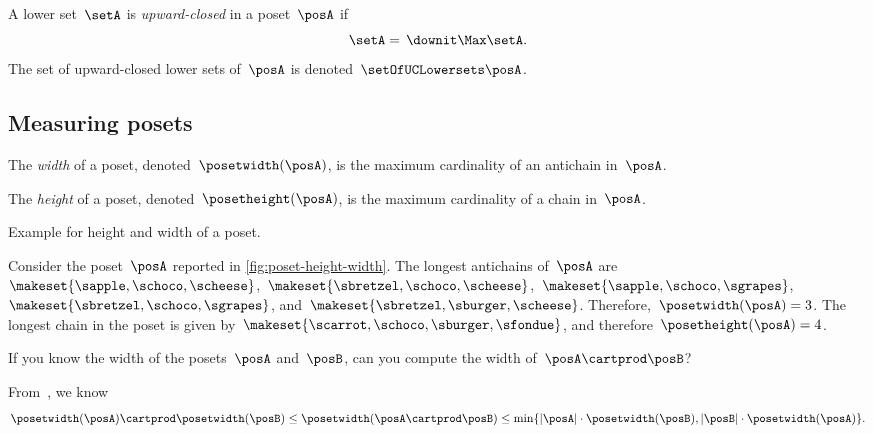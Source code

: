 \begin{definition}
    \label{def:upward-closed-lowerset}
    A lower set~$\setA$ is \emph{upward-closed} in a poset~$\posA$ if
    \begin{equation}
        \setA =\, \downit  \Max \setA.
    \end{equation}
    The set of upward-closed lower sets of~$\posA$ is denoted~$\setOfUCLowersets \posA$.

\end{definition}

\subsection{Measuring posets}
\begin{definition}
    \label{def:poset-width}
    The \emph{width} of a poset, denoted~$\posetwidth(\posA)$, is the maximum cardinality of an antichain in~$\posA$.
\end{definition}

\begin{definition}
    \label{def:poset-height}
    The \emph{height} of a poset, denoted~$\posetheight(\posA)$, is the maximum cardinality of a chain in~$\posA$.
\end{definition}

\begin{marginfigure}
    \centering
    \caption{Example for height and width of a poset.}
    \label{fig:poset-height-width}
\end{marginfigure}

\begin{example}
    Consider the poset~$\posA$ reported in \cref{fig:poset-height-width}.
    The longest antichains of~$\posA$ are~$\makeset{\sapple, \schoco, \scheese}$,~$\makeset{\sbretzel, \schoco, \scheese}$,~$\makeset{\sapple, \schoco, \sgrapes}$,~$\makeset{\sbretzel, \schoco, \sgrapes}$, and~$\makeset{\sbretzel, \sburger, \scheese}$.
    Therefore,~$\posetwidth(\posA)=3$.
    The longest chain in the poset is given by~$\makeset{\scarrot,\schoco,\sburger,\sfondue}$, and therefore~$\posetheight(\posA)=4$.
\end{example}

\begin{exercise}
    \label{ex:width}
    If you know the width of the posets~$\posA$ and~$\posB$, can you compute the width of~$\posA\cartprod\posB$?
\end{exercise}
\begin{solution}
    From~\cite{bezrukovantichains}, we know
    \begin{equation*}
        \posetwidth(\posA)\cartprod \posetwidth(\posB)\leq \posetwidth(\posA\cartprod \posB)\leq \min \{ \vert \posA\vert \cdot \posetwidth(\posB),\vert \posB \vert \cdot \posetwidth(\posA)\}.
    \end{equation*}
\end{solution}

